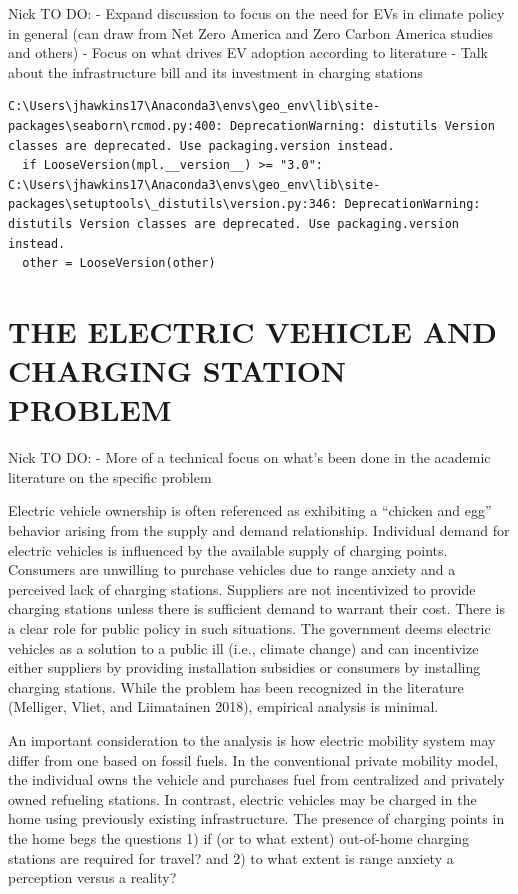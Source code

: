 \documentclass[
  letterpaper,
  DIV=11,
  numbers=noendperiod]{scrartcl}
\begin{document}
Nick TO DO: - Expand discussion to focus on the need for EVs in climate
policy in general (can draw from Net Zero America and Zero Carbon
America studies and others) - Focus on what drives EV adoption according
to literature - Talk about the infrastructure bill and its investment in
charging stations

\begin{verbatim}
C:\Users\jhawkins17\Anaconda3\envs\geo_env\lib\site-packages\seaborn\rcmod.py:400: DeprecationWarning: distutils Version classes are deprecated. Use packaging.version instead.
  if LooseVersion(mpl.__version__) >= "3.0":
C:\Users\jhawkins17\Anaconda3\envs\geo_env\lib\site-packages\setuptools\_distutils\version.py:346: DeprecationWarning: distutils Version classes are deprecated. Use packaging.version instead.
  other = LooseVersion(other)
\end{verbatim}

\hypertarget{the-electric-vehicle-and-charging-station-problem}{%
\section{THE ELECTRIC VEHICLE AND CHARGING STATION
PROBLEM}\label{the-electric-vehicle-and-charging-station-problem}}

Nick TO DO: - More of a technical focus on what's been done in the
academic literature on the specific problem

Electric vehicle ownership is often referenced as exhibiting a ``chicken
and egg'' behavior arising from the supply and demand relationship.
Individual demand for electric vehicles is influenced by the available
supply of charging points. Consumers are unwilling to purchase vehicles
due to range anxiety and a perceived lack of charging stations.
Suppliers are not incentivized to provide charging stations unless there
is sufficient demand to warrant their cost. There is a clear role for
public policy in such situations. The government deems electric vehicles
as a solution to a public ill (i.e., climate change) and can incentivize
either suppliers by providing installation subsidies or consumers by
installing charging stations. While the problem has been recognized in
the literature (Melliger, Vliet, and Liimatainen 2018), empirical
analysis is minimal.

An important consideration to the analysis is how electric mobility
system may differ from one based on fossil fuels. In the conventional
private mobility model, the individual owns the vehicle and purchases
fuel from centralized and privately owned refueling stations. In
contrast, electric vehicles may be charged in the home using previously
existing infrastructure. The presence of charging points in the home
begs the questions 1) if (or to what extent) out-of-home charging
stations are required for travel? and 2) to what extent is range anxiety
a perception versus a reality?
\end{document}
